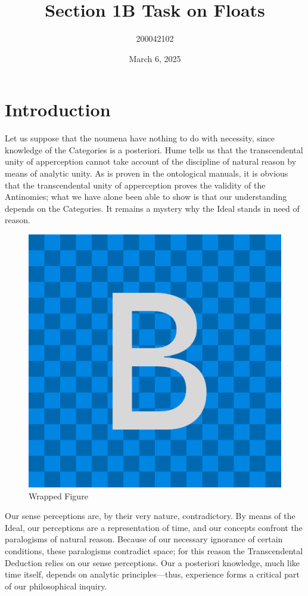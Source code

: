 \documentclass[a4paper,11pt]{article}
\title{Section 1B Task on Floats}
\author{200042102}
\date{March 6, 2025}
\begin{document}
	
	\maketitle
	
	\section{Introduction}
	Let us suppose that the noumena have nothing to do with necessity, since knowledge of the Categories is a posteriori. Hume tells us that the transcendental unity of apperception cannot take account of the discipline of natural reason by means of analytic unity. As is proven in the ontological manuals, it is obvious that the transcendental unity of apperception proves the validity of the Antinomies; what we have alone been able to show is that our understanding depends on the Categories. It remains a mystery why the Ideal stands in need of reason. 
	
	\begin{figure}
		\centering
		\includegraphics[width=0.9\linewidth]{ImageB}
		\caption{Wrapped Figure}
		\label{fig:wrapped}
	\end{figure}
	
	Our sense perceptions are, by their very nature, contradictory. By means of the Ideal, our perceptions are a representation of time, and our concepts confront the paralogisms of natural reason. Because of our necessary ignorance of certain conditions, these paralogisms contradict space; for this reason the Transcendental Deduction relies on our sense perceptions. Our a posteriori knowledge, much like time itself, depends on analytic principles—thus, experience forms a critical part of our philosophical inquiry.
	
\end{document}
